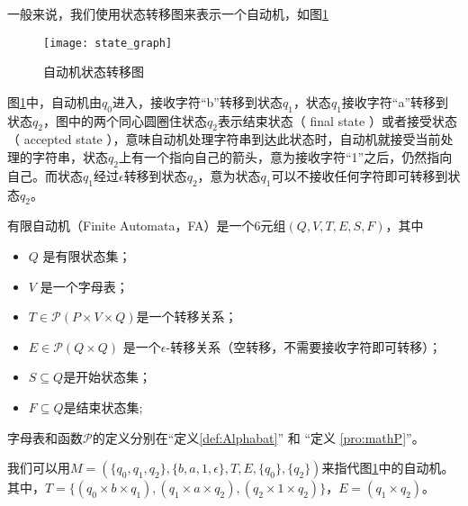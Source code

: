 \begin{remark}
    一般来说，我们使用状态转移图来表示一个自动机，如图\ref{fig:state_graph}
\end{remark}


\begin{figure}[!htbp]
    \centering
    \texttt{[image: state\_graph]}
    \caption{自动机状态转移图}
    \label{fig:state_graph}
\end{figure}

图\ref{fig:state_graph}中，自动机由$q_0$进入，接收字符“b”转移到状态$q_1$，状态$q_1$接收字符“a”转移到状态$q_2$，图中的两个同心圆圈住状态$q_2$表示结束状态（ final state ）或者接受状态（ accepted state ），意味自动机处理字符串到达此状态时，自动机就接受当前处理的字符串，状态$q_2$上有一个指向自己的箭头，意为接收字符“1”之后，仍然指向自己。而状态$q_1$经过$\epsilon$转移到状态$q_2$，意为状态$q_1$可以不接收任何字符即可转移到状态$q_2$。%

\begin{definition}
    有限自动机（Finite Automata，FA）是一个6元组$(Q,V,T,E,S,F)$，其中
    \begin{itemize}
        \item $Q$ 是有限状态集；
        \item $V$ 是一个字母表；
        \item $ T \in \mathcal{P}(P\times V \times Q) $是一个转移关系；
        \item $ E \in \mathcal{P}(Q\times Q)$ 是一个$\epsilon$-转移关系（空转移，不需要接收字符即可转移）；
        \item $ S \subseteq Q $是开始状态集；
        \item $ F \subseteq Q $是结束状态集;
    \end{itemize}
    字母表和函数$\mathcal{P}$的定义分别在“定义\ref{def:Alphabat}” 和 “定义 \ref{pro:mathP}”。
\end{definition}

\begin{example}
    我们可以用$M=(\{q_0,q_1,q_2\},\{b,a,1,\epsilon\},T,E,\{q_0\},\{q_2\})$来指代图\ref{fig:state_graph}中的自动机。其中，$T=\{(q_0 \times b \times q_1),(q_1\times a \times q_2),(q_2\times 1 \times q_2)\}$，$E=(q_1 \times q_2)$。
\end{example}

